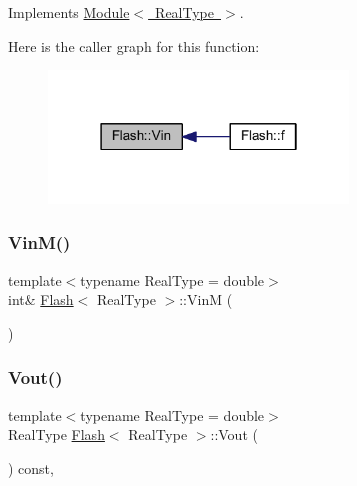 Implements \mbox{\hyperlink{class_module_a5ef6a7e21c2941a3e8940e7c0e5f0670}{Module$<$ Real\+Type $>$}}.

Here is the caller graph for this function\+:\nopagebreak
\begin{figure}[H]
\begin{center}
\leavevmode
\includegraphics[width=226pt]{class_flash_a6b1604cf88d584aeea83f00bc7587dda_icgraph}
\end{center}
\end{figure}
\mbox{\label{class_flash_a16c48c278f54a6de62dd8c1241e9670a}} 
\subsubsection{\texorpdfstring{Vin\+M()}{VinM()}}
{\footnotesize\ttfamily template$<$typename Real\+Type = double$>$ \\
int\& \mbox{\hyperlink{class_flash}{Flash}}$<$ Real\+Type $>$\+::VinM (\begin{DoxyParamCaption}{ }\end{DoxyParamCaption})\hspace{0.3cm}{\ttfamily [inline]}}

\mbox{\label{class_flash_aadd1e6c91da7d8a56b69f815b4346c5b}} 
\subsubsection{\texorpdfstring{Vout()}{Vout()}}
{\footnotesize\ttfamily template$<$typename Real\+Type = double$>$ \\
Real\+Type \mbox{\hyperlink{class_flash}{Flash}}$<$ Real\+Type $>$\+::Vout (\begin{DoxyParamCaption}{ }\end{DoxyParamCaption}) const\hspace{0.3cm}{\ttfamily [inline]}, {\ttfamily [virtual]}}



